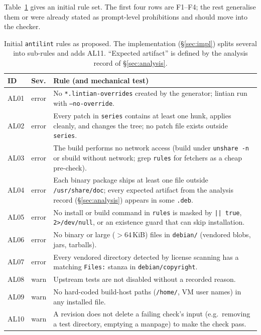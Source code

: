 \documentclass[11pt]{article}
\newcommand{\file}[1]{\texttt{#1}}
\begin{document}
Table~\ref{tab:rules} gives an initial rule set. The first four rows are
F1--F4; the rest generalise them or were already stated as prompt-level
prohibitions and should move into the checker.

\begin{table}[ht]
\centering\small
\begin{tabularx}{\linewidth}{@{}l l X@{}}
\toprule
ID & Sev. & Rule (and mechanical test) \\
\midrule
AL01 & error & No \file{*.lintian-overrides} created by the generator; lintian
  run with \texttt{--no-override}. \\
AL02 & error & Every patch in \file{series} contains at least one hunk, applies
  cleanly, and changes the tree; no patch file exists outside \file{series}. \\
AL03 & error & The build performs no network access (build under
  \texttt{unshare -n} or sbuild without network; grep \file{rules} for
  fetchers as a cheap pre-check). \\
AL04 & error & Each binary package ships at least one file outside
  \file{/usr/share/doc}; every expected artifact from the analysis record
  (\S\ref{sec:analysis}) appears in some \file{.deb}. \\
AL05 & error & No install or build command in \file{rules} is masked by
  \texttt{|| true}, \texttt{2>/dev/null}, or an existence guard that can
  skip installation. \\
AL06 & error & No binary or large ($>$64\,KiB) files in \file{debian/}
  (vendored blobs, jars, tarballs). \\
AL07 & error & Every vendored directory detected by license scanning has a
  matching \texttt{Files:} stanza in \file{debian/copyright}. \\
AL08 & warn & Upstream tests are not disabled without a recorded reason. \\
AL09 & warn & No hard-coded build-host paths (\file{/home/}, VM user names)
  in any installed file. \\
AL10 & warn & A revision does not delete a failing check's input (e.g.\
  removing a test directory, emptying a manpage) to make the check pass. \\
\bottomrule
\end{tabularx}
\caption{Initial \texttt{antilint} rules as proposed. The implementation
(\S\ref{sec:impl}) splits several into sub-rules and adds AL11. ``Expected artifact'' is defined
by the analysis record of \S\ref{sec:analysis}.}
\label{tab:rules}
\end{table}
\end{document}
